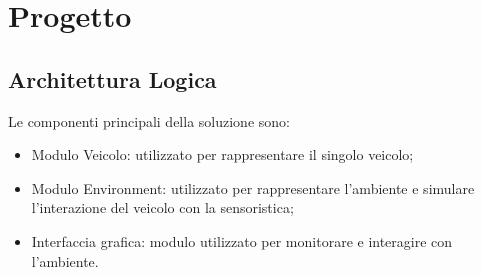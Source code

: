 \documentclass{memoir}
\begin{document}
%

\chapter{Progetto}

\section{Architettura Logica}
\label{sec:arclog}
Le componenti principali della soluzione sono:
\begin{itemize}
\item Modulo Veicolo: utilizzato per rappresentare il singolo veicolo;
\item Modulo Environment: utilizzato per rappresentare l'ambiente e simulare
  l'interazione del veicolo con la sensoristica;
\item Interfaccia grafica: modulo utilizzato per monitorare e interagire con
  l'ambiente.
\end{itemize}
\end{document}

